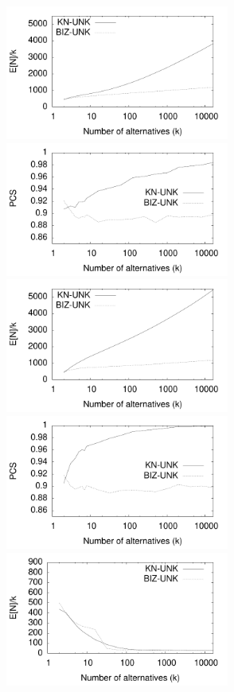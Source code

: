 \documentclass[12pt]{article}
\begin{document}
  \begin{figure}[tb]
    \center
    \includegraphics[width=2.9in]{pdf/FINAL-UNK-SCINC-Nk} 
    \includegraphics[width=2.9in]{pdf/FINAL-UNK-SCINC-PCS}
    \includegraphics[width=2.9in]{pdf/FINAL-UNK-SCDEC-Nk} 
    \includegraphics[width=2.9in]{pdf/FINAL-UNK-SCDEC-PCS}
    \includegraphics[width=2.9in]{pdf/FINAL-UNK-MDMINC-Nk} 

\end{figure}
\end{document}
